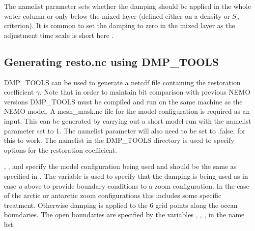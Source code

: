 The namelist parameter  sets whether the damping should be applied in the whole water column or only below the mixed layer (defined either on a density or $S_o$ criterion). It is common to set the damping to zero in the mixed layer as the adjustment time scale is short here \citep{Madec_al_JPO96}.

\subsection[DMP\_TOOLS]{Generating resto.nc using DMP\_TOOLS}

DMP\_TOOLS can be used to generate a netcdf file containing the restoration coefficient $\gamma$. Note that in order to maintain bit comparison with previous NEMO versions DMP\_TOOLS must be compiled and run on the same machine as the NEMO model. A mesh\_mask.nc file for the model configuration is required as an input. This can be generated by carrying out a short model run with the namelist parameter  set to 1. The namelist parameter  will also need to be set to .false. for this to work. The  namelist in the DMP\_TOOLS directory is used to specify options for the restoration coefficient.


, ,  and  specify the model configuration being used and should be the same as specified in . The variable  is used to specify that the damping is being used as in case \textit{a} above to provide boundary conditions to a zoom configuration. In the case of the arctic or antarctic zoom configurations this includes some specific treatment. Otherwise damping is applied to the 6 grid points along the ocean boundaries. The open boundaries are specified by the variables , , ,  in the  name list.

